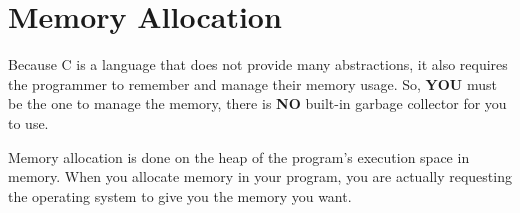 \section{Memory Allocation}\label{sec:Memory_Allocation}
Because C is a language that does not provide many abstractions, it also requires the programmer to remember and manage their memory usage.
So, \textbf{YOU} must be the one to manage the memory, there is \textbf{NO} built-in garbage collector for you to use.

Memory allocation is done on the heap of the program's execution space in memory.
When you allocate memory in your program, you are actually requesting the operating system to give you the memory you want.


